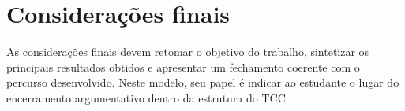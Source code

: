 
\chapter{Considerações finais}

As considerações finais devem retomar o objetivo do trabalho, sintetizar os principais resultados obtidos e apresentar um fechamento coerente com o percurso desenvolvido. Neste modelo, seu papel é indicar ao estudante o lugar do encerramento argumentativo dentro da estrutura do TCC.
